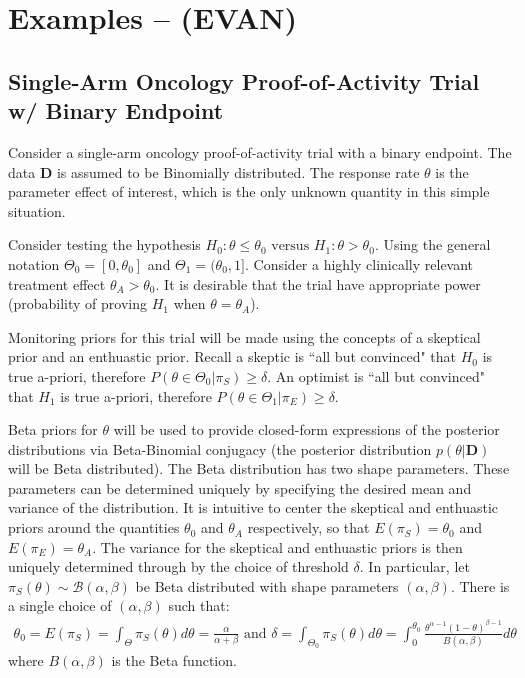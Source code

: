 \documentclass[12pt]{article}
\begin{document}
\section{Examples -- (EVAN)}

\subsection{Single-Arm Oncology Proof-of-Activity Trial w/ Binary Endpoint}


Consider a single-arm oncology proof-of-activity trial with a binary endpoint. The data $\mathbf{D}$ is assumed to be Binomially distributed. The response rate $\theta$ is the parameter effect of interest, which is the only unknown quantity in this simple situation.

Consider testing the hypothesis $H_0:\theta\leq\theta_0\text{ versus }H_1:\theta>\theta_0$. Using the general notation $\Theta_0=[0,\theta_0]$ and $\Theta_1=(\theta_0,1]$. Consider a highly clinically relevant treatment effect $\theta_A>\theta_0$. It is desirable that the trial have appropriate power (probability of proving $H_1$ when $\theta=\theta_A$). 

Monitoring priors for this trial will be made using the concepts of a skeptical prior and an enthuastic prior. Recall a skeptic is ``all but convinced" that $H_0$ is true a-priori, therefore $P(\theta\in\Theta_0|\pi_S)\geq\delta$. An optimist is ``all but convinced" that $H_1$ is true a-priori, therefore $P(\theta\in\Theta_1|\pi_E)\geq\delta$. 

Beta priors for $\theta$ will be used to provide closed-form expressions of the posterior distributions via Beta-Binomial conjugacy (the posterior distribution $p(\theta|\mathbf{D})$ will be Beta distributed). The Beta distribution has two shape parameters. These parameters can be determined uniquely by specifying the desired mean and variance of the distribution. It is intuitive to center the skeptical and enthuastic priors around the quantities $\theta_0$ and $\theta_A$ respectively, so that $E(\pi_S)=\theta_0$ and $E(\pi_E)=\theta_A$. The variance for the skeptical and enthuastic priors is then uniquely determined through by the choice of threshold $\delta$. In particular, let $\pi_S(\theta)\sim \mathcal{B}(\alpha,\beta)$ be Beta distributed with shape parameters $(\alpha,\beta)$. There is a single choice of $(\alpha,\beta)$ such that:
\begin{align*}
\theta_0=E(\pi_S)=\int_{\Theta}\pi_S(\theta)d\theta=\frac{\alpha}{\alpha+\beta}\text{ and }\delta=\int_{\Theta_0}\pi_S(\theta)d\theta=\int_{0}^{\theta_0}\frac{\theta^{\alpha-1}(1-\theta)^{\beta-1}}{B(\alpha,\beta)}d\theta
\end{align*}
where $B(\alpha,\beta)$ is the Beta function.
\end{document}
